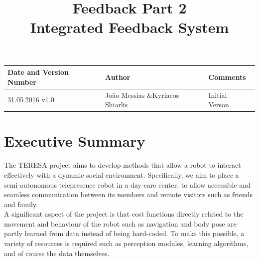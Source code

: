 \documentclass[a4paper,11pt]{report}
\title{Feedback Part 2\\ Integrated Feedback System}
\begin{document}
\maketitle
\makeheader


\begin{documentinfo}

\begin{tabular}{|p{5cm}|p{4cm}|p{5cm}|}
        \hline
        \rowcolor{gray!50}
        Date and Version Number & Author & Comments\\ \hline
        31.05.2016 v1.0 & Jo\~ao Messias \&\hfill Kyriacos Shiarlis & Initial Verson.\\ \hline
\end{tabular}

\end{documentinfo}


\pagebreak
\pagebreak

\tableofcontents

\pagebreak

\listoffigures

\pagebreak

\listoftables

\pagebreak




\section{Executive Summary}\label{sec:sum}

The TERESA project aims to develop methods that allow a robot to interact effectively with a dynamic social environment. Specifically, we aim to place a semi-autonomous telepresence robot in a day-care center, to allow accessible and seamless communication between its members and remote visitors such as friends and family.\\

 A significant aspect of the project is that cost functions directly related to the movement and behaviour of the robot such as navigation and body pose are partly learned from data instead of being hard-coded. To make this possible, a variety of resources is required such as perception modules, learning algorithms, and of course the data themselves. \\
\end{document}
